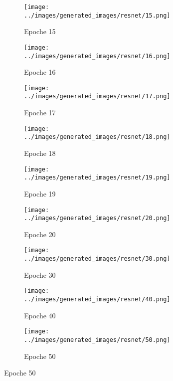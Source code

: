 \begin{figure}[H]
\begin{subfigure}[b]{0.1\textwidth}
   \centering
   \texttt{[image: ../images/generated\_images/resnet/15.png]}
   \caption{Epoche 15}
 \end{subfigure}
 \hspace{1em}%
 \begin{subfigure}[b]{0.1\textwidth}
 \centering
 \texttt{[image: ../images/generated\_images/resnet/16.png]}
 \caption{Epoche 16}
 \end{subfigure}
 \hspace{1em}%
 \begin{subfigure}[b]{0.1\textwidth}
 \centering
 \texttt{[image: ../images/generated\_images/resnet/17.png]}
 \caption{Epoche 17}
\end{subfigure}
\hspace{1em}%
\begin{subfigure}[b]{0.1\textwidth}
 \centering
 \texttt{[image: ../images/generated\_images/resnet/18.png]}
 \caption{Epoche 18}
\end{subfigure}
\hspace{1em}%
\begin{subfigure}[b]{0.1\textwidth}
 \centering
 \texttt{[image: ../images/generated\_images/resnet/19.png]}
 \caption{Epoche 19}
\end{subfigure}
\hspace{1em}%
\begin{subfigure}[b]{0.1\textwidth}
\centering
\texttt{[image: ../images/generated\_images/resnet/20.png]}
\caption{Epoche 20}
\end{subfigure}
\hspace{1em}%
\begin{subfigure}[b]{0.1\textwidth}
 \centering
 \texttt{[image: ../images/generated\_images/resnet/30.png]}
 \caption{Epoche 30}
\end{subfigure}
\hspace{1em}%
\begin{subfigure}[b]{0.1\textwidth}
 \centering
 \texttt{[image: ../images/generated\_images/resnet/40.png]}
 \caption{Epoche 40}
\end{subfigure}
\hspace{1em}%
\begin{subfigure}[b]{0.1\textwidth}
 \centering
 \texttt{[image: ../images/generated\_images/resnet/50.png]}
 \caption{Epoche 50}
\end{subfigure}
\hspace{1em}%

\end{figure}

